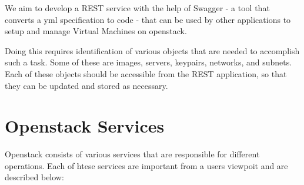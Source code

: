 We aim to develop a REST service with the help of Swagger - a tool
that converts a yml specification to code - that can be used by other
applications to setup and manage Virtual Machines on openstack.

Doing this requires identification of various objects that are needed
to accomplish such a task. Some of these are images, servers,
keypairs, networks, and subnets. Each of these objects should be
accessible from the REST application, so that they can be updated and
stored as necessary.

\section{Openstack Services}
Openstack consists of various services that are responsible for
different operations. Each of htese services are important from a
users viewpoit and are described below:

